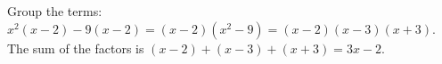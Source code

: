 Group the terms: $x^2(x-2)-9(x-2)=(x-2)(x^2-9)=(x-2)(x-3)(x+3)$. The sum of the factors is $(x-2)+(x-3)+(x+3)=\boxed{3x-2}$.
